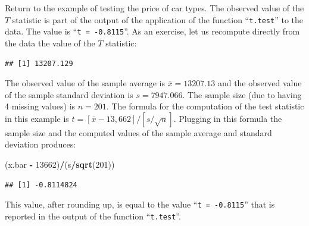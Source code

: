 \documentclass[]{krantz}
\makeatletter
\newenvironment{Shaded}{\begin{snugshade}}{\end{snugshade}}
\newcommand{\KeywordTok}[1]{\textcolor[rgb]{0.13,0.29,0.53}{\textbf{#1}}}
\newcommand{\DataTypeTok}[1]{\textcolor[rgb]{0.13,0.29,0.53}{#1}}
\newcommand{\DecValTok}[1]{\textcolor[rgb]{0.00,0.00,0.81}{#1}}
\newcommand{\StringTok}[1]{\textcolor[rgb]{0.31,0.60,0.02}{#1}}
\newcommand{\OtherTok}[1]{\textcolor[rgb]{0.56,0.35,0.01}{#1}}
\newcommand{\OperatorTok}[1]{\textcolor[rgb]{0.81,0.36,0.00}{\textbf{#1}}}
\newcommand{\NormalTok}[1]{#1}
\newenvironment{kframe}{%
\medskip{}
\setlength{\fboxsep}{.8em}
 \def\at@end@of@kframe{}%
 \ifinner\ifhmode%
  \def\at@end@of@kframe{\end{minipage}}%
  \begin{minipage}{\columnwidth}%
 \fi\fi%
 \def\FrameCommand##1{\hskip\@totalleftmargin \hskip-\fboxsep
 \colorbox{shadecolor}{##1}\hskip-\fboxsep
     \hskip-\linewidth \hskip-\@totalleftmargin \hskip\columnwidth}%
 \MakeFramed {\advance\hsize-\width
   \@totalleftmargin\z@ \linewidth\hsize
   \@setminipage}}%
 {\par\unskip\endMakeFramed%
 \at@end@of@kframe}
\renewenvironment{Shaded}{\begin{kframe}}{\end{kframe}}
\theoremstyle{definition}
\theoremstyle{definition}
\theoremstyle{definition}
\theoremstyle{remark}
\makeatother
\begin{document}
Return to the example of testing the price of car types. The observed
value of the \(T\) statistic is part of the output of the application of
the function ``\texttt{t.test}'' to the data. The value is
``\texttt{t\ =\ -0.8115}''. As an exercise, let us recompute directly
from the data the value of the \(T\) statistic:

\begin{Shaded}
\end{Shaded}

\begin{verbatim}
## [1] 13207.129
\end{verbatim}

\begin{Shaded}
\end{Shaded}

The observed value of the sample average is \(\bar x = 13207.13\) and
the observed value of the sample standard deviation is \(s = 7947.066\).
The sample size (due to having 4 missing values) is \(n=201\). The
formula for the computation of the test statistic in this example is
\(t = [\bar x - 13,662]/[s/\sqrt{n}]\). Plugging in this formula the
sample size and the computed values of the sample average and standard
deviation produces:

\begin{Shaded}
\begin{Highlighting}[]
\NormalTok{(x.bar }\OperatorTok{-}\StringTok{ }\DecValTok{13662}\NormalTok{)}\OperatorTok{/}\NormalTok{(s}\OperatorTok{/}\KeywordTok{sqrt}\NormalTok{(}\DecValTok{201}\NormalTok{))}
\end{Highlighting}
\end{Shaded}

\begin{verbatim}
## [1] -0.8114824
\end{verbatim}

This value, after rounding up, is equal to the value
``\texttt{t\ =\ -0.8115}'' that is reported in the output of the
function ``\texttt{t.test}''.
\end{document}
